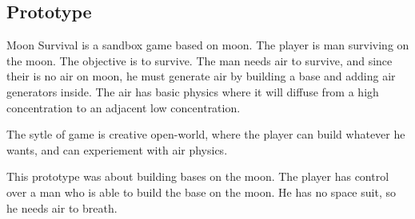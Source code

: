 \subsection{\prototypeSiddall Prototype}




Moon Survival is a sandbox game based on moon.
The player is man surviving on the moon.
The objective is to survive.
The man needs air to survive, and since their is no air on moon, he must generate air by building a base and adding air generators inside.
The air has basic physics where it will diffuse from a high concentration to an adjacent low concentration.

The sytle of game is creative open-world, where the player can build whatever he wants, and can experiement with air physics.



This prototype was about building bases on the moon.
The player has control over a man who is able to build the base on the moon.
He has no space suit, so he needs air to breath.

